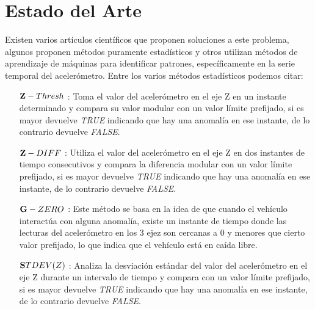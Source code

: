 \chapter{Estado del Arte}\label{chapter:state-of-the-art}

Existen varios artículos científicos que proponen soluciones a este problema, algunos proponen métodos puramente estadísticos y otros utilizan métodos de aprendizaje de máquinas para identificar patrones, específicamente en la serie temporal del acelerómetro. Entre los varios métodos estadísticos podemos citar: \\

\begin{enumerate}
	\item [$\bold Z-Thresh$]: Toma el valor del acelerómetro en el eje Z en un instante determinado y compara su valor modular con un valor límite prefijado, si es mayor devuelve {\it TRUE} indicando que hay una anomalía en ese instante, de lo contrario devuelve {\it FALSE}.\\
	\item [ $\bold Z-DIFF$ ]: Utiliza el valor del acelerómetro en el eje Z en dos instantes de tiempo consecutivos y compara la diferencia modular con un valor límite prefijado, si es mayor devuelve {\it TRUE} indicando que hay una anomalía en ese instante, de lo contrario devuelve {\it FALSE}.\\
	\item [ $\bold G-ZERO$ ]: Este método se basa en la idea de que cuando el vehículo interactúa con alguna anomalía, existe un instante de tiempo donde las lecturas del acelerómetro en los 3 ejez son cercanas a 0 y menores que cierto valor prefijado, lo que indica que el vehículo está en caída libre.\\
	\item [ $\bold STDEV(Z)$ ]: Analiza la desviación estándar del valor del acelerómetro en el eje Z durante un intervalo de tiempo y compara con un valor límite prefijado, si es mayor devuelve {\it TRUE} indicando que hay una anomalía en ese instante, de lo contrario devuelve {\it FALSE}.\\ 
\end{enumerate}
